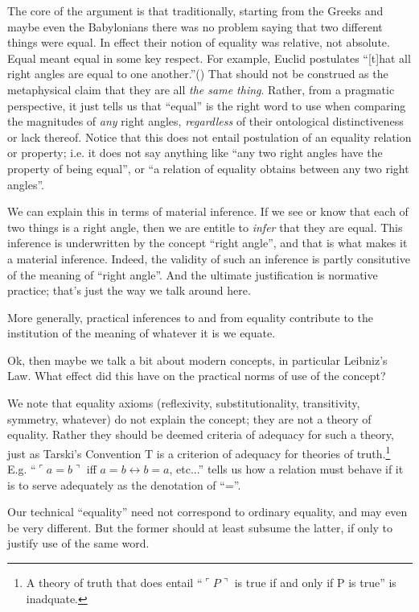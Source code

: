 \documentclass{article}
\begin{document}
The core of the argument is that traditionally, starting from the
Greeks and maybe even the Babylonians there was no problem saying that
two different things were equal. In effect their notion of equality
was relative, not absolute. Equal meant equal in some key respect. For
example, Euclid postulates \enquote{[t]hat all right angles are equal
  to one another.}(\cite{euclid}) That should not be construed as the
metaphysical claim that they are all \textit{the same thing}. Rather,
from a pragmatic perspective, it just tells us that ``equal'' is the
right word to use when comparing the magnitudes of \textit{any} right
angles, \textit{regardless} of their ontological distinctiveness or
lack thereof. Notice that this does not entail postulation of an
equality relation or property; i.e. it does not say anything like
``any two right angles have the property of being equal'', or ``a
relation of equality obtains between any two right angles''.

We can explain this in terms of material inference. If we see or know
that each of two things is a right angle, then we are entitle to
\textit{infer} that they are equal. This inference is underwritten by
the concept ``right angle'', and that is what makes it a material
inference. Indeed, the validity of such an inference is partly
consitutive of the meaning of ``right angle''. And the ultimate
justification is normative practice; that's just the way we talk
around here.

More generally, practical inferences to and from equality contribute
to the institution of the meaning of whatever it is we equate.

Ok, then maybe we talk a bit about modern concepts, in particular
Leibniz's Law. What effect did this have on the practical norms of use
of the concept?

We note that equality axioms (reflexivity, substitutionality,
transitivity, symmetry, whatever) do not explain the concept; they are
not a theory of equality. Rather they should be deemed criteria of
adequacy for such a theory, just as Tarski's Convention T is a
criterion of adequacy for theories of truth.\footnote{A theory of
truth that does entail ``\(\ulcorner P\urcorner\) is true if and only
if P is true'' is inadquate.} E.g. ``\(\ulcorner a = b\urcorner\) iff
\(a=b ↔ b=a\), etc...'' tells us how a relation must behave if it is
to serve adequately as the denotation of ``=''.

Our technical ``equality'' need not correspond to ordinary equality,
and may even be very different. But the former should at least subsume
the latter, if only to justify use of the same word.
\end{document}
